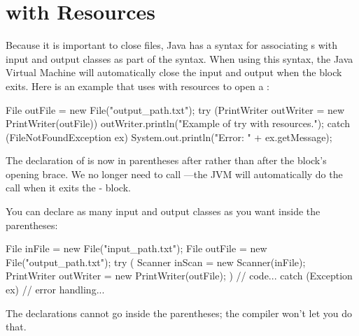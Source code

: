 \section{ with Resources}

Because it is important to close files, Java has a syntax for associating s with input and output classes as part of the  syntax. When using this syntax, the Java Virtual Machine will automatically close the input and output when the  block exits. Here is an example that uses  with resources to open  a :

\begin{code}
File outFile = new File("output_path.txt");
try (PrintWriter outWriter = new PrintWriter(outFile)) {
    outWriter.println("Example of try with resources.");
}
catch (FileNotFoundException ex) {
    System.out.println("Error: " + ex.getMessage);
}
\end{code}

The declaration of  is now in parentheses after  rather than after the block's opening brace.
We no longer need to call ---the JVM will automatically do the call when it exits the - block.

You can declare as many input and output classes as you want inside the parentheses:

\begin{code}
File inFile = new File("input_path.txt");
File outFile = new File("output_path.txt");
try (
    Scanner inScan = new Scanner(inFile);
    PrintWriter outWriter = new PrintWriter(outFile);
) {
    // code...
}
catch (Exception ex) {
    // error handling...
}
\end{code}

The  declarations cannot go inside the parentheses; the compiler won't let you do that.
